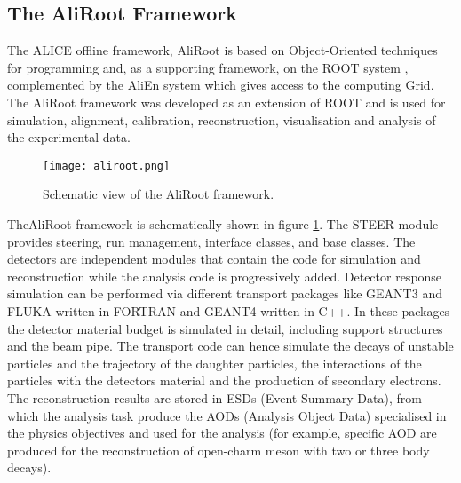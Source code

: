 \subsection{The AliRoot Framework}
The ALICE offline framework, AliRoot \cite{trigger2} is based on Object-Oriented techniques for programming and, as a supporting framework, on the ROOT system \cite{root}, complemented by the AliEn system which gives access to the computing Grid. The AliRoot framework was developed as an extension of ROOT and is used for simulation, alignment, calibration, reconstruction, visualisation and analysis of the experimental data.
\begin{figure}[h]
\centering
\texttt{[image: aliroot.png]}
\caption{Schematic view of the AliRoot framework.}
\label{fig:aliroot}
\end{figure}
TheAliRoot framework is schematically shown in figure \ref{fig:aliroot}. The STEER module provides steering, run management, interface classes, and base classes. The detectors are independent modules that contain the code for simulation and reconstruction while the analysis code is progressively added. Detector response simulation can be performed via different transport  packages like GEANT3 \cite{geant3} and FLUKA \cite{fluka} written in FORTRAN and GEANT4 \cite{geant4} written in C++. In these packages the detector material budget is simulated in detail, including support structures and the beam pipe. The transport code can hence simulate the decays of unstable particles and the trajectory of the daughter particles, the interactions of the particles with the detectors material and the production of secondary electrons.\\
The reconstruction results are stored in ESDs (Event Summary Data), from which the analysis task produce the AODs (Analysis Object Data) specialised in the physics objectives and used for the analysis (for example, specific AOD are produced for the reconstruction of open-charm meson with two or three body decays).


